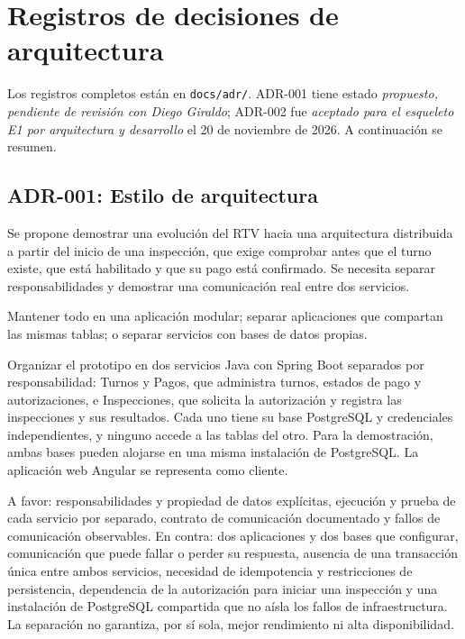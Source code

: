 \documentclass[11pt,a4paper]{article}
\begin{document}
	\section{Registros de decisiones de arquitectura}
	Los registros completos están en \texttt{docs/adr/}. ADR-001 tiene estado \emph{propuesto, pendiente de revisión con Diego Giraldo}; ADR-002 fue \emph{aceptado para el esqueleto E1 por arquitectura y desarrollo} el 20 de noviembre de 2026. A continuación se resumen.
	
	\subsection{ADR-001: Estilo de arquitectura}
	\begin{description}[leftmargin=3.2cm,style=nextline]
		\item[Contexto] Se propone demostrar una evolución del RTV hacia una arquitectura distribuida a partir del inicio de una inspección, que exige comprobar antes que el turno existe, que está habilitado y que su pago está confirmado. Se necesita separar responsabilidades y demostrar una comunicación real entre dos servicios.
		\item[Opciones] Mantener todo en una aplicación modular; separar aplicaciones que compartan las mismas tablas; o separar servicios con bases de datos propias.
		\item[Decisión] Organizar el prototipo en dos servicios Java con Spring Boot separados por responsabilidad: Turnos y Pagos, que administra turnos, estados de pago y autorizaciones, e Inspecciones, que solicita la autorización y registra las inspecciones y sus resultados. Cada uno tiene su base PostgreSQL y credenciales independientes, y ninguno accede a las tablas del otro. Para la demostración, ambas bases pueden alojarse en una misma instalación de PostgreSQL. La aplicación web Angular se representa como cliente.
		\item[Consecuencias] A favor: responsabilidades y propiedad de datos explícitas, ejecución y prueba de cada servicio por separado, contrato de comunicación documentado y fallos de comunicación observables. En contra: dos aplicaciones y dos bases que configurar, comunicación que puede fallar o perder su respuesta, ausencia de una transacción única entre ambos servicios, necesidad de idempotencia y restricciones de persistencia, dependencia de la autorización para iniciar una inspección y una instalación de PostgreSQL compartida que no aísla los fallos de infraestructura. La separación no garantiza, por sí sola, mejor rendimiento ni alta disponibilidad.
	\end{description}
	
\end{document}
